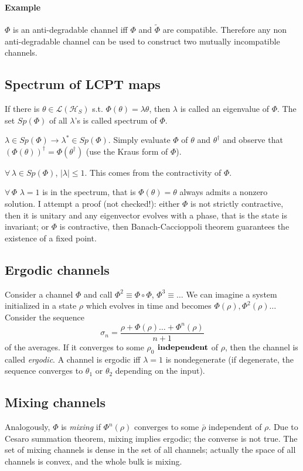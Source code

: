 \documentclass[a4paper, 11pt]{article}
\newcommand{\HH}{\mathcal{H}}
\begin{document}
	\paragraph{Example}
	$\Phi$ is an anti-degradable channel iff $\Phi$ and $\tilde{\Phi}$ are compatible. Therefore any non anti-degradable channel can be used to construct two mutually incompatible channels.
	
	\subsection{Spectrum of LCPT maps}
	If there is $\theta\in \mathcal{L}(\HH_S)$ s.t. $\Phi(\theta) = \lambda \theta$, then $\lambda$ is called an eigenvalue of $\Phi$. The set $Sp(\Phi)$ of all $\lambda$'s is called spectrum of $\Phi$.
	
	$\lambda\in Sp(\Phi) \rightarrow \lambda^* \in Sp(\Phi)$. Simply evaluate $\Phi$ of $\theta$ and $\theta^\dagger$ and observe that $(\Phi(\theta))^\dagger = \Phi(\theta^\dagger)$ (use the Kraus form of $\Phi$).
	
	$\forall\, \lambda\in Sp(\Phi)$, $|\lambda|\le 1$. This comes from the contractivity of $\Phi$.
	
	$\forall\,\Phi$ $\lambda=1$ is in the spectrum, that is $\Phi(\theta)=\theta$ always admits a nonzero solution. I attempt a proof (not checked!): either $\Phi$ is not strictly contractive, then it is unitary and any eigenvector evolves with a phase, that is the state is invariant; or $\Phi$ is contractive, then Banach-Caccioppoli theorem guarantees the existence of a fixed point.
	
	\subsection{Ergodic channels}
	Consider a channel $\Phi$ and call $\Phi^2\equiv \Phi\circ\Phi$, $\Phi^3\equiv\dots$ We can imagine a system initialized in a state $\rho$ which evolves in time and becomes $\Phi(\rho),\Phi^2(\rho)\dots$ Consider the sequence
	\[ \sigma_n = \dfrac{\rho + \Phi(\rho) \dots +\Phi^n(\rho)}{n+1} \]
	of the averages. If it converges to some $\rho_0$ $\bf{independent}$ of $\rho$, then the channel is called \emph{ergodic}. A channel is ergodic iff $\lambda=1$ is nondegenerate (if degenerate, the sequence converges to $\theta_1$ or $\theta_2$ depending on the input).
	
	\subsection{Mixing channels}
	Analogously, $\Phi$ is \emph{mixing} if $\Phi^n(\rho)$ converges to some $\bar{\rho}$ independent of $\rho$. Due to Cesaro summation theorem, mixing implies ergodic; the converse is not true. The set of mixing channels is dense in the set of all channels; actually the space of all channels is convex, and the whole bulk is mixing.
	
\end{document}
